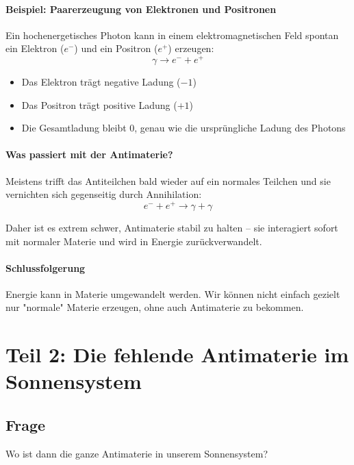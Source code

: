\documentclass{article}
\begin{document}
	\paragraph{Beispiel: Paarerzeugung von Elektronen und Positronen}
	Ein hochenergetisches Photon kann in einem elektromagnetischen Feld spontan ein Elektron ($e^-$) und ein Positron ($e^+$) erzeugen:
	\begin{equation}
		\gamma \rightarrow e^- + e^+
	\end{equation}
	
	\begin{itemize}
		\item Das Elektron trägt negative Ladung ($-1$)
		\item Das Positron trägt positive Ladung ($+1$)
		\item Die Gesamtladung bleibt $0$, genau wie die ursprüngliche Ladung des Photons
	\end{itemize}
	
	\paragraph{Was passiert mit der Antimaterie?}
	Meistens trifft das Antiteilchen bald wieder auf ein normales Teilchen und sie vernichten sich gegenseitig durch Annihilation:
	\begin{equation}
		e^- + e^+ \rightarrow \gamma + \gamma
	\end{equation}
	
	Daher ist es extrem schwer, Antimaterie stabil zu halten – sie interagiert sofort mit normaler Materie und wird in Energie zurückverwandelt.
	
	\paragraph{Schlussfolgerung}
		Energie kann in Materie umgewandelt werden.
		Wir können nicht einfach gezielt nur "normale" Materie erzeugen, ohne auch Antimaterie zu bekommen.

	\section{Teil 2: Die fehlende Antimaterie im Sonnensystem}
	
	\subsection{Frage}
	Wo ist dann die ganze Antimaterie in unserem Sonnensystem?
	
\end{document}
